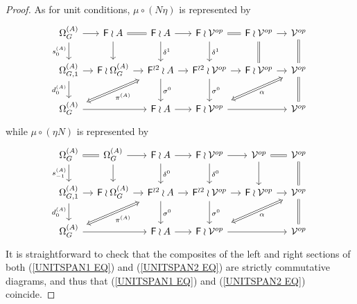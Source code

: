 \documentclass[a4paper,10pt]{article}%
\begin{document}
\begin{proof}
As for unit conditions, $\mu \circ (N \eta)$ is represented by
\begin{equation}\label{UNITSPAN1 EQ}
	\begin{tikzcd}[column sep=1.05em]
	\Omega_G^{(A)} \ar{d}[swap]{s_{0}^{(A)}} \ar{r} &
	\Fin \wr A \ar{d} \ar[equal]{r} &
	\Fin \wr A \ar{d}{\delta^1} \ar{r} &
	\Fin \wr \mathcal{V}^{op} \ar{d}{\delta^1} \ar[equal]{r} &
	\Fin \wr \mathcal{V}^{op} \ar[equal]{d} \ar{r} &
	\mathcal{V}^{op} \ar[equal]{d}
\\
	\Omega_{G,1}^{(A)} \ar{r} \ar{d}[swap]{d_{0}^{(A)}}&
	\Fin \wr \Omega_{G}^{(A)} \ar{r} &
	|[alias=FFOmega]|\Fin^{\wr 2} \wr A \ar{d}{\sigma^0} \ar{r} &
	\Fin^{\wr 2} \wr \mathcal{V}^{op} \ar{d}{\sigma^0} \ar{r} &
	\Fin \wr \mathcal{V}^{op} \ar{r} &
	|[alias=dog]|
	\mathcal{V}^{op} \ar[equal]{d}
\\
	|[alias=Omega]|\Omega_{G}^{(A)} \ar{rr}&&
	\Fin \wr A \ar{r} &
	|[alias=cat]|
	\Fin \wr \mathcal{V}^{op} \ar{rr} &&
	\mathcal{V}^{op}
	\arrow[Leftrightarrow, from=FFOmega, to=Omega,shorten <=0.15cm,,shorten >=0.15cm,"\pi^{(A)}"]
	\arrow[Leftrightarrow, from=dog, to=cat,shorten <=0.15cm,,shorten >=0.15cm,"\alpha"]
	\end{tikzcd}
\end{equation}
while $\mu \circ (\eta N)$ is represented by 
\begin{equation}\label{UNITSPAN2 EQ}
	\begin{tikzcd}[column sep=1.05em]
	\Omega^{(A)}_G \ar{d}[swap]{s_{-1}^{(A)}} \ar[equal]{r} &
	\Omega^{(A)}_G \ar{d} \ar{r} &
	\Fin \wr A \ar{d}{\delta^0} \ar{r} &
	\Fin \wr \mathcal{V}^{op} \ar{d}{\delta^0} \ar{r} &
	\mathcal{V}^{op} \ar{d} \ar[equal]{r} &
	\mathcal{V}^{op} \ar[equal]{d}
\\
	\Omega_{G,1}^{(A)} \ar{r} \ar{d}[swap]{d_{0}^{(A)}}&
	\Fin \wr \Omega_{G}^{(A)} \ar{r} &
	|[alias=FFOmega]|\Fin^{\wr 2} \wr A \ar{d}{\sigma^0} \ar{r} &
	\Fin^{\wr 2} \wr \mathcal{V}^{op} \ar{d}{\sigma^0} \ar{r} &
	\Fin \wr \mathcal{V}^{op} \ar{r} &
	|[alias=dog]|
	\mathcal{V}^{op} \ar[equal]{d}
\\
	|[alias=Omega]|\Omega_{G}^{(A)} \ar{rr} &&
	\Fin \wr A \ar{r} &
	|[alias=cat]|
	\Fin \wr \mathcal{V}^{op} \ar{rr} &&
	\mathcal{V}^{op}
	\arrow[Leftrightarrow, from=FFOmega, to=Omega,shorten <=0.15cm,,shorten >=0.15cm,"\pi^{(A)}"]
	\arrow[Leftrightarrow, from=dog, to=cat,shorten <=0.15cm,,shorten >=0.15cm,"\alpha"]
	\end{tikzcd}
\end{equation}
It is straightforward to check that the composites of the left and right sections of both (\ref{UNITSPAN1 EQ}) and (\ref{UNITSPAN2 EQ}) are strictly commutative diagrams, and thus that 
(\ref{UNITSPAN1 EQ}) and (\ref{UNITSPAN2 EQ}) coincide.
\end{proof}
\end{document}
